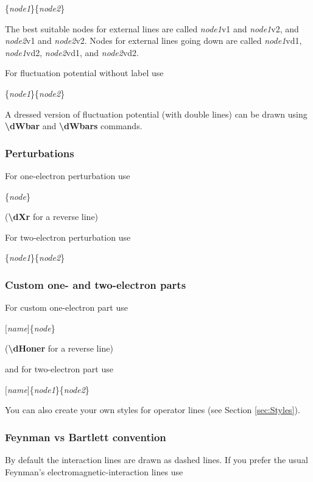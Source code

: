 \documentclass[a4paper]{article}
\newcommand{\myind}{\hspace{10pt}}
\begin{document}
\myind{\bf \textbackslash dW}\{{\it node1}\}\{{\it node2}\}

The best suitable nodes for external lines are called {\it node1}v1 and {\it node1}v2, 
and {\it node2}v1 and {\it node2}v2.
Nodes for external lines going down are called {\it node1}vd1, {\it node1}vd2, 
{\it node2}vd1, and {\it node2}vd2.

For fluctuation potential without label use

\myind{\bf \textbackslash dWs}\{{\it node1}\}\{{\it node2}\}

A dressed version of fluctuation potential (with double lines) can be drawn
using {\bf \textbackslash dWbar} and {\bf \textbackslash dWbars} commands.

\subsubsection{Perturbations}

For one-electron perturbation use

\myind{\bf \textbackslash dX}\{{\it node}\}

({\bf \textbackslash dXr} for a reverse line)

For two-electron perturbation use

\myind{\bf \textbackslash dXtwo}\{{\it node1}\}\{{\it node2}\}


\subsubsection{Custom one- and two-electron parts}

For custom one-electron part use

\myind{\bf \textbackslash dHone}$[${\it name}$]$\{{\it node}\}

({\bf \textbackslash dHoner} for a reverse line)

and for two-electron part use

\myind{\bf \textbackslash dHtwo}$[${\it name}$]$\{{\it node1}\}\{{\it node2}\}

You can also create your own styles for operator lines (see Section \ref{sec:Styles}).

\subsubsection{Feynman vs Bartlett convention}

By default the interaction lines are drawn as dashed lines. If you prefer the 
usual Feynman's electromagnetic-interaction lines use
\end{document}

